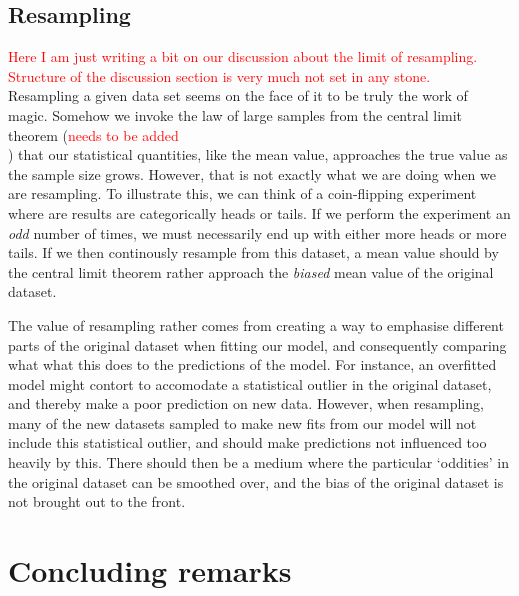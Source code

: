 \documentclass[twocolumn,english,notitlepage]{article}
\newcommand{\comment}[1]{\textcolor{red}{#1}\\}
\begin{document}
    \subsection{Resampling}
        \comment{Here I am just writing a bit on our discussion about the limit of resampling. Structure of the discussion section is very much not set in any stone.}
        Resampling a given data set seems on the face of it to be truly the work of magic. Somehow we invoke the law of large samples from the central limit theorem (\comment{needs to be added}) that our statistical quantities, like the mean value, approaches the true value as the sample size grows. However, that is not exactly what we are doing when we are resampling. To illustrate this, we can think of a coin-flipping experiment where are results are categorically heads or tails. If we perform the experiment an \textit{odd} number of times, we must necessarily end up with either more heads or more tails. If we then continously resample from this dataset, a mean value should by the central limit theorem rather approach the \textit{biased} mean value of the original dataset.

        The value of resampling rather comes from creating a way to emphasise different parts of the original dataset when fitting our model, and consequently comparing what what this does to the predictions of the model. For instance, an overfitted model might contort to accomodate a statistical outlier in the original dataset, and thereby make a poor prediction on new data. However, when resampling, many of the new datasets sampled to make new fits from our model will not include this statistical outlier, and should make predictions not influenced too heavily by this. There should then be a medium where the particular `oddities' in the original dataset can be smoothed over, and the bias of the original dataset is not brought out to the front.


\section{Concluding remarks}
\end{document}

